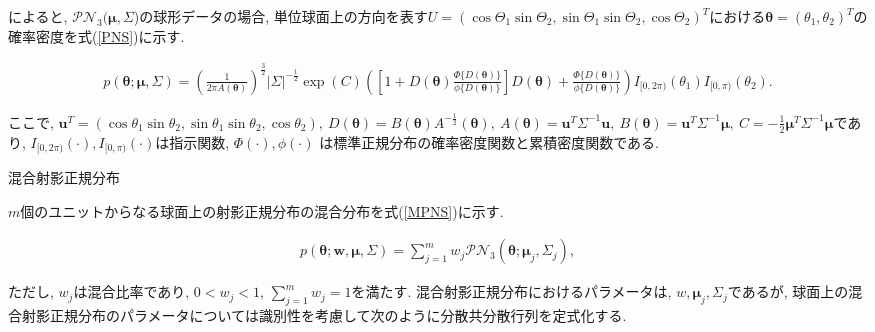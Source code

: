 \documentclass[a4j,11pt]{jarticle}
\makeatletter
\def\subsection{\@startsection{subsection}{1}{\z@}
   {0.8\Cvs \@plus.5\Cdp \@minus.2\Cdp}
   {0.2\Cvs \@plus.3\Cdp}
   {\normalfont \normalsize \bfseries}}
\makeatother
\begin{document}

\citet{GPN}によると, $\mathcal{PN}_3(\bm \mu,\Sigma$)の球形データの場合, 単位球面上の方向を表す$U = (\cos\Theta_1 \sin \Theta_2, \sin\Theta_1 \sin \Theta_2, \cos \Theta_2)^T$における$\bm \theta = (\theta_1, \theta_2)^T$の確率密度を式(\ref{PNS})に示す.

\vspace{-1zh}
\begin{eqnarray}
\label{PNS}
p(\bm \theta; \bm \mu, \Sigma) = \left(\frac{1}{2\pi A(\bm \theta)}\right)^{\frac{3}{2}} |\Sigma|^{-\frac{1}{2}}
\exp(C)\left( \left[1 + D(\bm \theta) \frac{\Phi \{D(\bm \theta)\}}{\phi \{D(\bm \theta)\}} \right] D(\bm \theta) + \frac{\Phi \{D(\bm \theta)\}}{\phi \{D(\bm \theta)\}} \right) I_{[0,2\pi)}(\theta_1) I_{[0,\pi)}(\theta_2).
\end{eqnarray}

\noindent
ここで, $\bm u^T = (\cos\theta_1 \sin \theta_2, \sin\theta_1 \sin \theta_2, \cos \theta_2), 
\ D(\bm \theta) = B(\bm \theta) A^{-\frac{1}{2}}(\bm \theta), \ A(\bm \theta) = \bm u^T \Sigma^{-1} \bm u, \ B(\bm \theta) = \bm u^T \Sigma^{-1} \bm \mu, \ C = -\frac{1}{2} \bm \mu^T \Sigma^{-1} \bm \mu$であり, $I_{[0,2\pi)} (\cdot), I_{[0,\pi)}(\cdot)$は指示関数, $\Phi(\cdot), \phi(\cdot)$ は標準正規分布の確率密度関数と累積密度関数である.

\vspace{-1zh}
\subsection{混合射影正規分布}

$m$個のユニットからなる球面上の射影正規分布の混合分布を式(\ref{MPNS})に示す. 

\vspace{-2zh}
\begin{eqnarray}
\label{MPNS}
p(\bm \theta;\bm w,\bm \mu, \Sigma) = \sum^m_{j=1} w_j \mathcal{PN}_3(\bm \theta;\bm \mu_j, \Sigma_j),
\end{eqnarray}

\vspace{-1zh}
\noindent
ただし, $w_j$は混合比率であり, $0 < w_j < 1$, $\sum^m_{j=1} w_j = 1$を満たす. 混合射影正規分布におけるパラメータは, $w, \bm \mu_j, \Sigma_j$であるが, 球面上の混合射影正規分布のパラメータについては識別性を考慮して次のように分散共分散行列を定式化する. 
\end{document}
